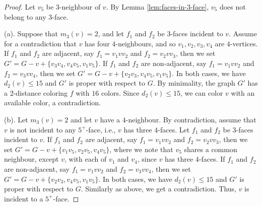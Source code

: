 \documentclass[12pt, reqno]{amsart}
\theoremstyle{plain}
\theoremstyle{definition}
\numberwithin{equation}{section}
\begin{document}
\begin{proof}
Let $v_5$ be $3$-neighbour of $v$. By Lemma \ref{lem:faces-in-3-face}, $v_5$ does not belong to any $3$-face.

(a). Suppose that $m_3(v)=2$, and let $f_1$ and $f_2$ be $3$-faces incident to $v$. Assume for a contradiction that $v$ has four $4$-neighbours, and so $v_1,v_2,v_3,v_4$ are $4$-vertices. If $f_1$ and $f_2$ are adjacent, say $f_1=v_1vv_2$ and $f_2=v_2vv_3$, then we set $G'=G-v+\{v_3v_4,v_4v_5,v_1v_5\}$. If $f_1$ and $f_2$ are non-adjacent, say $f_1=v_1vv_2$ and $f_2=v_3vv_4$, then we set $G'=G-v+\{v_2v_3,v_4v_5,v_1v_5\}$. In both cases, we have $d_2(v)\leq 15$ and $G'$ is proper with respect to $G$.  By minimality, the graph $G'$ has a 2-distance coloring $f$ with $16$ colors.  Since $d_2(v)\leq 15$, we can color $v$ with an available color, a contradiction. 



(b). Let $m_3(v)=2$ and let $v$ have a $4$-neighbour. By contradiction, assume that $v$ is not incident to any $5^+$-face, i.e., $v$ has three $4$-faces. Let $f_1$ and $f_2$ be $3$-faces incident to $v$.  
If $f_1$ and $f_2$ are adjacent, say $f_1=v_1vv_2$ and $f_2=v_2vv_3$, then we set $G'=G-v+\{v_1v_5,v_2v_5,v_4v_5\}$, where we note that $v_5$ shares a common neighbour, except $v$, with each of $v_1$ and $v_4$, since $v$ has three $4$-faces.
If $f_1 $ and $f_2$ are non-adjacent, say $f_1=v_1vv_2$ and $f_2=v_3vv_4$, then we set $G'=G-v+\{v_2v_3,v_4v_5,v_1v_5\}$. In both cases, we have $d_2(v)\leq 15$ and $G'$ is proper with respect to $G$.  Similarly as above, we get a contradiction. Thus, $v$ is incident to a $5^+$-face. 



\end{proof}
\end{document}
